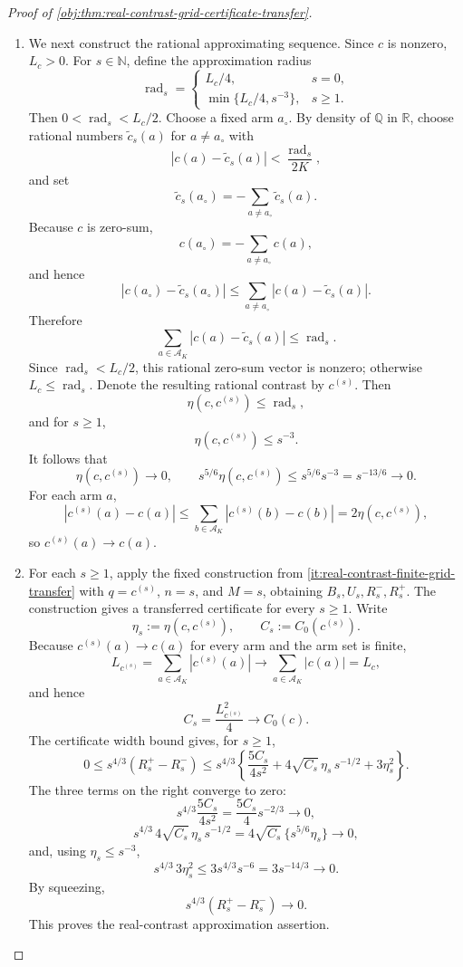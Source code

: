 \begin{proof}[Proof of \cref{obj:thm:real-contrast-grid-certificate-transfer}]
\begin{enumerate}
\item We next construct the rational approximating sequence.  Since \(c\) is nonzero, \(L_c>0\).  For \(s\in\mathbb N\), define the approximation radius
\[
\operatorname{rad}_s=
\begin{cases}
L_c/4,& s=0,\\
\min\{L_c/4,s^{-3}\},& s\ge1 .
\end{cases}
\]
Then \(0<\operatorname{rad}_s<L_c/2\).  Choose a fixed arm \(a_\circ\).  By density of \(\mathbb Q\) in \(\mathbb R\), choose rational numbers \(\widetilde c_s(a)\) for \(a\ne a_\circ\) with
\[
|c(a)-\widetilde c_s(a)|<\frac{\operatorname{rad}_s}{2K},
\]
and set
\[
\widetilde c_s(a_\circ)
=
-\sum_{a\ne a_\circ}\widetilde c_s(a).
\]
Because \(c\) is zero-sum,
\[
c(a_\circ)=-\sum_{a\ne a_\circ}c(a),
\]
and hence
\[
|c(a_\circ)-\widetilde c_s(a_\circ)|
\le
\sum_{a\ne a_\circ}|c(a)-\widetilde c_s(a)|.
\]
Therefore
\[
\sum_{a\in\mathcal A_K}|c(a)-\widetilde c_s(a)|
\le \operatorname{rad}_s .
\]
Since \(\operatorname{rad}_s<L_c/2\), this rational zero-sum vector is nonzero; otherwise \(L_c\le\operatorname{rad}_s\).  Denote the resulting rational contrast by \(c^{(s)}\).  Then
\[
\eta(c,c^{(s)})\le \operatorname{rad}_s,
\]
and for \(s\ge1\),
\[
\eta(c,c^{(s)})\le s^{-3}.
\]
It follows that
\[
\eta(c,c^{(s)})\to0,
\qquad
s^{5/6}\eta(c,c^{(s)})
\le s^{5/6}s^{-3}=s^{-13/6}\to0 .
\]
For each arm \(a\),
\[
|c^{(s)}(a)-c(a)|
\le
\sum_{b\in\mathcal A_K}|c^{(s)}(b)-c(b)|
=
2\eta(c,c^{(s)}),
\]
so \(c^{(s)}(a)\to c(a)\). %

\item For each \(s\ge1\), apply the fixed construction from \cref{it:real-contrast-finite-grid-transfer} with \(q=c^{(s)}\), \(n=s\), and \(M=s\), obtaining \(B_s,U_s,R_s^-,R_s^+\).  The construction gives a transferred certificate for every \(s\ge1\).  Write
\[
\eta_s:=\eta(c,c^{(s)}),
\qquad
C_s:=C_0(c^{(s)}).
\]
Because \(c^{(s)}(a)\to c(a)\) for every arm and the arm set is finite,
\[
L_{c^{(s)}}=\sum_{a\in\mathcal A_K}|c^{(s)}(a)|
\longrightarrow
\sum_{a\in\mathcal A_K}|c(a)|=L_c,
\]
and hence
\[
C_s=\frac{L_{c^{(s)}}^2}{4}\longrightarrow C_0(c).
\]
The certificate width bound gives, for \(s\ge1\),
\[
0\le s^{4/3}(R_s^+-R_s^-)
\le
s^{4/3}\left\{
\frac{5C_s}{4s^2}
+4\sqrt{C_s}\,\eta_s\,s^{-1/2}
+3\eta_s^2
\right\}.
\]
The three terms on the right converge to zero:
\[
s^{4/3}\frac{5C_s}{4s^2}
=
\frac{5C_s}{4}s^{-2/3}\to0,
\]
\[
s^{4/3}\,4\sqrt{C_s}\,\eta_s\,s^{-1/2}
=
4\sqrt{C_s}\,\{s^{5/6}\eta_s\}\to0,
\]
and, using \(\eta_s\le s^{-3}\),
\[
s^{4/3}\,3\eta_s^2
\le
3s^{4/3}s^{-6}
=
3s^{-14/3}\to0.
\]
By squeezing,
\[
s^{4/3}(R_s^+-R_s^-)\to0.
\]
This proves the real-contrast approximation assertion. %


\end{enumerate}
\end{proof}
